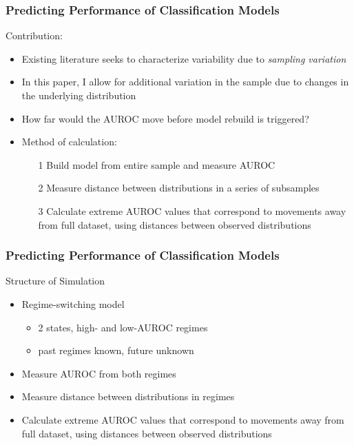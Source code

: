 \documentclass{beamer}
\begin{document}
\begin{frame}
\frametitle{Predicting Performance of Classification Models}

Contribution:
\begin{itemize}
    \item Existing literature seeks to characterize variability due to \emph{sampling variation}
    \item In this paper, I allow for additional variation in the sample due to changes in the underlying distribution
    \item How far would the AUROC move before model rebuild is triggered?
    \item Method of calculation:
    \begin{itemize}
        \item[1] Build model from entire sample and measure AUROC
        \item[2] Measure distance between distributions in a series of subsamples
        \item[3] Calculate extreme AUROC values that correspond to movements away from full dataset, using distances between observed distributions
    \end{itemize}
\end{itemize}

\end{frame}



\begin{frame}
\frametitle{Predicting Performance of Classification Models}

Structure of Simulation
\begin{itemize}
    \item Regime-switching model
    \begin{itemize}
        \item 2 states, high- and low-AUROC regimes
        \item past regimes known, future unknown
    \end{itemize}
    \item Measure AUROC from both regimes
    \item Measure distance between distributions in regimes
    \item Calculate extreme AUROC values that correspond to movements away from full dataset, using distances between observed distributions
\end{itemize}

\end{frame}
\end{document}
